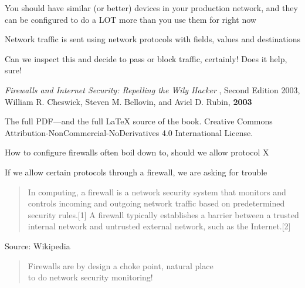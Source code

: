 \documentclass[Screen16to9,17pt]{foils}
\begin{document}
You should have similar (or better) devices in your production network, and they can be
configured to do a LOT more than you use them for right now




\begin{list2}
\item Network traffic is sent using network protocols with fields, values and destinations
\item Can we inspect this and decide to pass or block traffic, certainly! Does it help, sure!
\end{list2}




\begin{list2}
\item \emph{Firewalls and Internet Security: Repelling the Wily Hacker} , Second Edition 2003, William R. Cheswick, Steven M. Bellovin, and Aviel D. Rubin, {\bf 2003} 
\item The full PDF—and the full LaTeX source of the book.
Creative Commons Attribution-NonCommercial-NoDerivatives 4.0 International License.
\item How to configure firewalls often boil down to, should we allow protocol X
\item If we allow certain protocols through a firewall, we are asking for trouble
\end{list2}



\begin{quote}
In computing, a firewall is a network security system that monitors and controls incoming and outgoing network traffic based on predetermined security rules.[1] A firewall typically establishes a barrier between a trusted internal network and untrusted external network, such as the Internet.[2]
\end{quote}
Source: Wikipedia 

\begin{quote}
Firewalls are by design a choke point, natural place \\
to do network security monitoring!
\end{quote}
\end{document}
